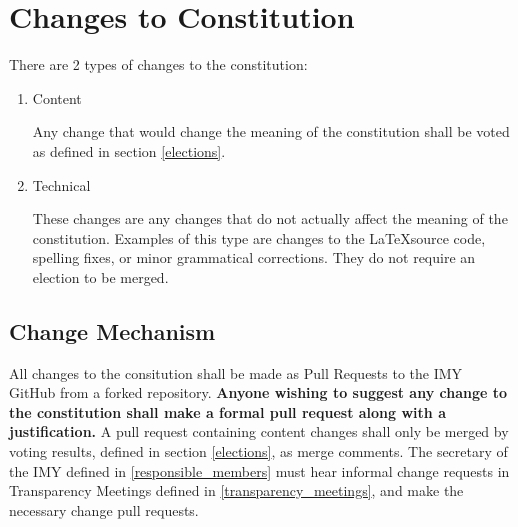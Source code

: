 \documentclass{article}
\begin{document}
\section{Changes to Constitution}
\label{changes}
There are
2
types of changes to the constitution:
\begin{enumerate}
      \item Content

            Any change that would change the meaning of the constitution shall be voted as defined in section
            \ref{elections}.
      \item Technical

            These changes are any changes that do not actually affect the meaning of the constitution.
            Examples of this type are changes to  the \LaTeX source code, spelling fixes, or minor grammatical corrections.
            They do not require an election to be merged.
\end{enumerate}

\subsection{Change Mechanism}
\label{change_mechanism}
All changes to the consitution shall be made as Pull Requests to the IMY GitHub from a forked repository.
\textbf{Anyone wishing to suggest any change to the constitution shall make a formal pull request along with a justification.}
A pull request containing content changes shall only be merged by voting results, defined in section \ref{elections}, as merge comments.
The secretary of the IMY defined in \ref{responsible_members} must hear informal change requests in Transparency Meetings defined in \ref{transparency_meetings}, and make the necessary change pull requests.
\end{document}
